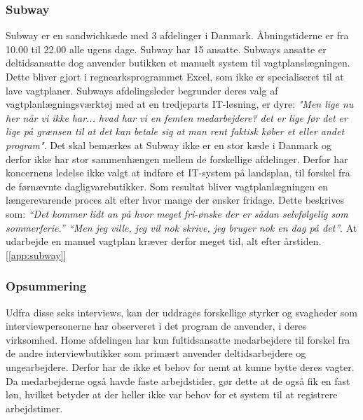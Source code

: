 \subsubsection{Subway}
Subway er en sandwichkæde med 3 afdelinger i Danmark. Åbningstiderne er fra 10.00 til 22.00 alle ugens dage. Subway har 15 ansatte. Subways ansatte er deltidsansatte dog anvender butikken et manuelt system til vagtplanslægningen. Dette bliver gjort i regnearksprogrammet Excel, som ikke er specialiseret til at lave vagtplaner. Subways afdelingsleder begrunder deres valg af vagtplanlægningsværktøj med at en tredjeparts IT-løsning, er dyre: \textit{"Men lige nu her når vi ikke har... hvad har vi en femten medarbejdere? det er lige før det er lige på grænsen til at det kan betale sig at man rent faktisk køber et eller andet program"}.
Det skal bemærkes at Subway ikke er en stor kæde i Danmark og derfor ikke har stor sammenhængen mellem de forskellige afdelinger. Derfor har koncernens ledelse ikke valgt at indføre et IT-system på landsplan, til forskel fra de førnævnte dagligvarebutikker. Som resultat bliver vagtplanlægningen en længerevarende proces alt efter hvor mange der ønsker fridage. Dette beskrives som: \textit{“Det kommer lidt an på hvor meget fri-ønske der er sådan selvfølgelig som sommerferie.” “Men jeg ville, jeg vil nok skrive, jeg bruger nok en dag på det”}. At udarbejde en manuel vagtplan kræver derfor meget tid, alt efter årstiden. [\ref{app:subway}]

\subsubsection{Opsummering}
Udfra disse seks interviews, kan der uddrages forskellige styrker og svagheder som interviewpersonerne har observeret i det program de anvender, i deres virksomhed. Home afdelingen har kun fultidsansatte medarbejdere til forskel fra de andre interviewbutikker som primært anvender deltidsarbejdere og ungearbejdere. Derfor har de ikke et behov for nemt at kunne bytte deres vagter. Da medarbejderne også havde faste arbejdstider, gør dette at de også fik en fast løn, hvilket betyder at der heller ikke var behov for et system til at registrere arbejdstimer.

